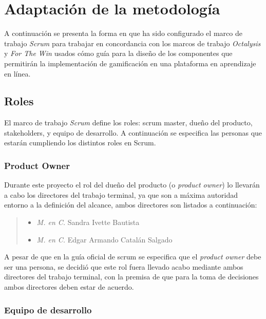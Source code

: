 

\section{Adaptación de la metodología}

 A continuación se presenta la forma en que ha sido configurado el marco de trabajo
 {\it Scrum} para trabajar en concordancia con los marcos de trabajo {\it Octalysis}
 y {\it For The Win} usados cómo guía para la diseño de los componentes que permitirán
 la implementación de gamificación en una plataforma en aprendizaje en línea.

\subsection{Roles}

 \noindent
 El marco de trabajo {\it Scrum} define los roles: scrum master, dueño del producto,
 stakeholders, y equipo de desarrollo. A continuación se especifica las personas que
 estarán cumpliendo los distintos roles en Scrum.

\subsubsection{Product Owner}

 Durante este proyecto el rol del dueño del producto (o {\it product owner}) lo
 llevarán a cabo los directores del trabajo terminal, ya que son a máxima autoridad
 entorno a la definición del alcance, ambos directores son listados a continuación:

    \begin{quote}
    \begin{itemize}
        \item {\it M. en C.} Sandra Ivette Bautista
        \item {\it M. en C.} Edgar Armando Catalán Salgado
    \end{itemize}
    \end{quote}

 \noindent
 A pesar de que en la guía oficial de scrum \cite{TheScrumGuide} se especifica que el
 {\it product owner} debe ser una persona, se decidió que este rol fuera llevado
 acabo mediante ambos directores del trabajo terminal, con la premisa de que para la
 toma de decisiones ambos directores deben estar de acuerdo.

\subsubsection{Equipo de desarrollo}

